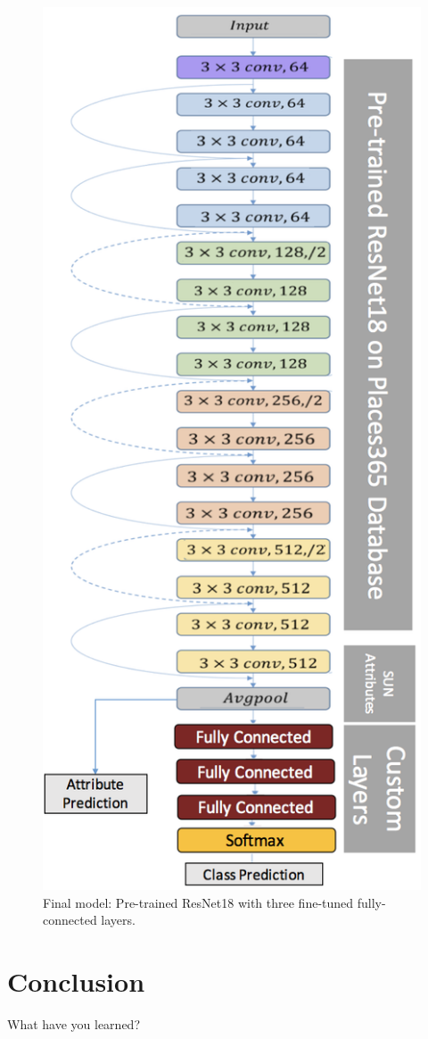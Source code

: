 \documentclass[10pt,twocolumn,letterpaper]{article}
\begin{document}
\begin{figure}[t]
\begin{center}
	\includegraphics[width=.7\linewidth]{model.png}
\end{center}
   \caption{Final model: Pre-trained ResNet18 with three fine-tuned fully-connected layers.}
\label{fig:long}
\label{fig:onecol}
\end{figure}



\section{Conclusion}
\label{sec:conclusion}
What have you learned? 
\end{document}

